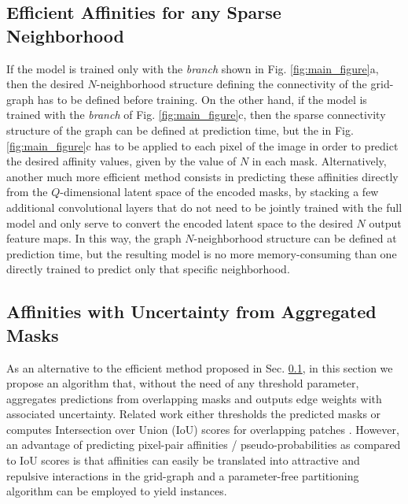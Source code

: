 \subsection{Efficient Affinities for any Sparse Neighborhood}\label{sec:efficient_affs}
If the model is trained only with the \emph{\sparseBr branch} shown in Fig. \ref{fig:main_figure}a, then the desired $N$-neighborhood structure defining the connectivity of the grid-graph has to be defined before training. 
On the other hand, if the model is trained with the \emph{\encBr branch} of Fig. \ref{fig:main_figure}c, then the sparse connectivity structure of the graph can be defined at prediction time, but the \maskDec in Fig. \ref{fig:main_figure}c has to be applied to each pixel of the image in order to predict the desired affinity values, given by the value of $N$ in each mask. 
Alternatively, another much more efficient method consists in predicting these affinities directly from the $Q$-dimensional latent space of the encoded masks, by stacking a few additional convolutional layers that do not need to be jointly trained with the full model and only serve to convert the encoded latent space to the desired $N$ output feature maps.
In this way, the graph $N$-neighborhood structure can be defined at prediction time, but the resulting model is no more memory-consuming than one directly trained to predict only that specific neighborhood. 



\subsection{Affinities with Uncertainty from Aggregated Masks}\label{sec:aggr_affs}
As an alternative to the efficient method proposed in Sec. \ref{sec:efficient_affs}, in this section we propose an algorithm that, without the need of any threshold parameter, aggregates predictions from overlapping \maskname masks and outputs edge weights with associated uncertainty.
Related work either thresholds the predicted \maskname masks \cite{januszewski2018high,hirsch2020patchperpix,meirovitch2016multi} or computes Intersection over Union (IoU) scores for overlapping patches \cite{liu2016multi}. However, an advantage of predicting pixel-pair affinities / pseudo-probabilities as compared to IoU scores is that affinities can easily be translated into attractive and repulsive interactions in the grid-graph 
and a parameter-free partitioning algorithm can be employed to yield instances.

